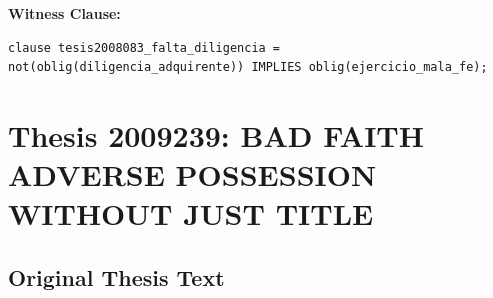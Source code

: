 \documentclass[11pt,a4paper]{article}
\begin{document}
\textbf{Witness Clause:}

\begin{lstlisting}[style=witnessstyle, language=Witness]
clause tesis2008083_falta_diligencia = not(oblig(diligencia_adquirente)) IMPLIES oblig(ejercicio_mala_fe);
\end{lstlisting}

\newpage

\section{Thesis 2009239: BAD FAITH ADVERSE POSSESSION WITHOUT JUST TITLE}
\label{thesis:2009239}

\subsection{Original Thesis Text}
\end{document}
